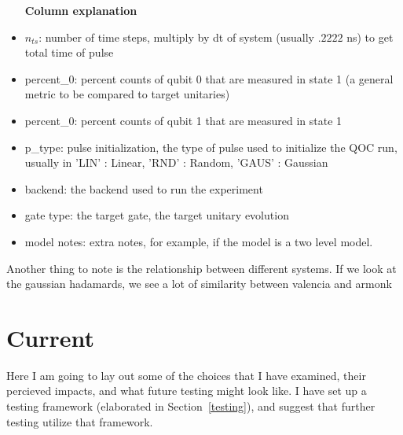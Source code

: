 \documentclass[12pt]{article}
\begin{document}
\begin{itemize}
    \item [\textbf{Column explanation}]
    \item $n_{ts}$: number of time steps, multiply by dt of system (usually
    $.2222$ ns) to get total time of pulse
    \item percent\_0: percent counts of qubit 0 that are measured in state 1 (a
    general metric to be compared to target unitaries)
    \item percent\_0: percent counts of qubit 1 that are measured in state 1 
    \item p\_type: pulse initialization, the type of pulse used to initialize
    the QOC run, usually in {'LIN' : Linear, 'RND' : Random, 'GAUS' : Gaussian}
    \item backend: the backend used to run the experiment
    \item gate type: the target gate, the target unitary evolution
    \item model notes: extra notes, for example, if the model is a two level model.
\end{itemize}


Another thing to note is the relationship between different systems. If we look
at the gaussian hadamards, we see a lot of similarity between valencia and
armonk

\section{Current}\label{current}

Here I am going to lay out some of the choices that I have examined, their
percieved impacts, and what future testing might look like. I have set up a
testing framework (elaborated in Section~\ref{testing}), and suggest that
further testing utilize that framework.
\end{document}
